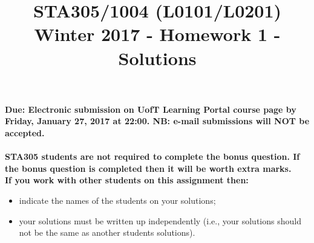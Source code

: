 \documentclass[11pt, oneside]{article}   	%
\title{STA305/1004 (L0101/L0201) Winter 2017 -  Homework 1 - Solutions}
\author{}
\date{}							%
\begin{document}
\maketitle


{\noindent \bf Due: Electronic submission on UofT Learning Portal course page by Friday, January 27, 2017 at 22:00. NB: e-mail submissions will NOT be accepted.} \\ \\
{\bf STA305 students are not required to complete the bonus question.  If the bonus question is completed then it will be worth extra marks.} \\

{\noindent \bf If you work with other students on this assignment then:}  
\begin{itemize}
\item indicate the names of the students on your solutions;  
\item your solutions must be written up independently (i.e., your solutions should not be the same as another students solutions).
\end{itemize}


\newpage
\end{document}
